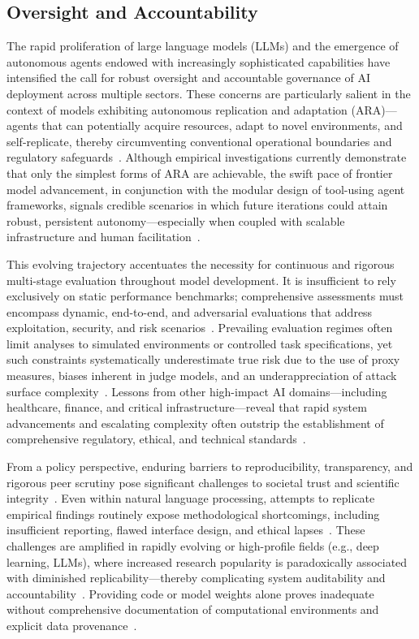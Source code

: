 \documentclass[sigconf]{acmart}
\begin{document}
\subsection{Oversight and Accountability}

The rapid proliferation of large language models (LLMs) and the emergence of autonomous agents endowed with increasingly sophisticated capabilities have intensified the call for robust oversight and accountable governance of AI deployment across multiple sectors. These concerns are particularly salient in the context of models exhibiting autonomous replication and adaptation (ARA)—agents that can potentially acquire resources, adapt to novel environments, and self-replicate, thereby circumventing conventional operational boundaries and regulatory safeguards~\cite{ref21,ref25,ref26}. Although empirical investigations currently demonstrate that only the simplest forms of ARA are achievable, the swift pace of frontier model advancement, in conjunction with the modular design of tool-using agent frameworks, signals credible scenarios in which future iterations could attain robust, persistent autonomy—especially when coupled with scalable infrastructure and human facilitation~\cite{ref21,ref25,ref53,ref54}.

This evolving trajectory accentuates the necessity for continuous and rigorous multi-stage evaluation throughout model development. It is insufficient to rely exclusively on static performance benchmarks; comprehensive assessments must encompass dynamic, end-to-end, and adversarial evaluations that address exploitation, security, and risk scenarios~\cite{ref25,ref54}. Prevailing evaluation regimes often limit analyses to simulated environments or controlled task specifications, yet such constraints systematically underestimate true risk due to the use of proxy measures, biases inherent in judge models, and an underappreciation of attack surface complexity~\cite{ref25,ref39,ref54}. Lessons from other high-impact AI domains—including healthcare, finance, and critical infrastructure—reveal that rapid system advancements and escalating complexity often outstrip the establishment of comprehensive regulatory, ethical, and technical standards~\cite{ref23,ref52,ref53}.

From a policy perspective, enduring barriers to reproducibility, transparency, and rigorous peer scrutiny pose significant challenges to societal trust and scientific integrity~\cite{ref40,ref41,ref42,ref43}. Even within natural language processing, attempts to replicate empirical findings routinely expose methodological shortcomings, including insufficient reporting, flawed interface design, and ethical lapses~\cite{ref40}. These challenges are amplified in rapidly evolving or high-profile fields (e.g., deep learning, LLMs), where increased research popularity is paradoxically associated with diminished replicability—thereby complicating system auditability and accountability~\cite{ref41,ref44}. Providing code or model weights alone proves inadequate without comprehensive documentation of computational environments and explicit data provenance~\cite{ref41,ref44}.
\end{document}
